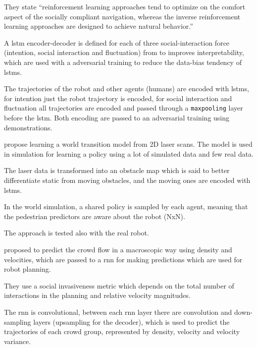 They state ``reinforcement learning approaches tend to optimize on the comfort aspect of the socially compliant navigation, whereas the inverse reinforcement learning approaches are designed to achieve natural behavior.''

A \gls{lstm} encoder-decoder is defined for each of three social-interaction force (intention, social interaction and fluctuation) from \cite{helbing1995social} to improves interpretability, which are used with a adversarial training to reduce the data-bias tendency of \glspl{lstm}.

The trajectories of the robot and other agents (humans) are encoded with \glspl{lstm}, for intention just the robot trajectory is encoded, for social interaction and fluctuation all trajectories are encoded and passed through a \texttt{maxpooling} layer before the \gls{lstm}.
%
Both encoding are passed to an adversarial training using demonstrations.




\cite{cui2021learning} propose learning a world transition model from 2D laser scans. The model is used in simulation for learning a policy using a lot of simulated data and few real data.

The laser data is transformed into an obstacle map which is said to better differentiate static from moving obstacles, and the moving ones are encoded with \glspl{lstm}.

In the world simulation, a shared policy is sampled by each agent, meaning that the pedestrian predictors are aware about the robot (NxN).

The approach is tested also with the real robot.
	


\cite{kiss2021probabilistic} proposed to predict the crowd flow in a macroscopic way using density and velocities, which are passed to a \gls{rnn} for making predictions which are used for robot planning.

They use a social invasiveness metric which depends on the total number of interactions in the planning and relative velocity magnitudes.

The \gls{rnn} is convolutional, between each \gls{rnn} layer there are convolution and down-sampling layers (upsampling for the decoder), which is used to predict the trajectories of each crowd group, represented by density, velocity and velocity variance.

